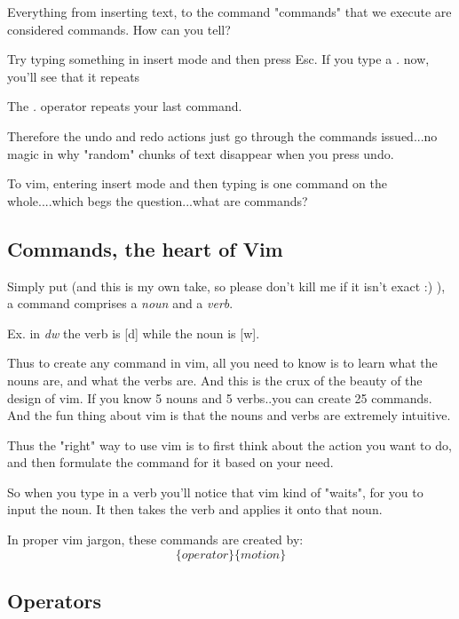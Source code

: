 \documentclass[12pt, letterpaper]{article}
\begin{document}
Everything from inserting text, to the command "commands" that we execute are
considered commands. How can you tell?

Try typing something in insert mode and then press Esc. If you type a
\textit{.} now, you'll see that it repeats

The \textit{.} operator repeats your last command. 

Therefore the undo and redo actions just go through the commands issued...no
magic in why "random" chunks of text disappear when you press undo.

To vim, entering insert mode and then typing is one command on the
whole....which begs the question...what are commands?

\subsection{Commands, the heart of Vim}
Simply put (and this is my own take, so please don't kill me if it isn't exact
:) ), a command comprises a \textit{noun} and a \textit{verb}.

Ex. in \textit{dw} the verb is [d] while the noun is [w].

Thus to create any command in vim, all you need to know is to learn what the
nouns are, and what the verbs are. And this is the crux of the beauty of the
design of vim. If you know 5 nouns and 5 verbs..you can create 25 commands. And
the fun thing about vim is that the nouns and verbs are extremely intuitive.

Thus the "right" way to use vim is to first think about the action you want to
do, and then formulate the command for it based on your need.

So when you type in a verb you'll notice that vim kind of "waits", for you to
input the noun. It then takes the verb and applies it onto that noun.

In proper vim jargon, these commands are created by:
$$\{operator\}\{motion\}$$

\subsection{Operators}
\end{document}
